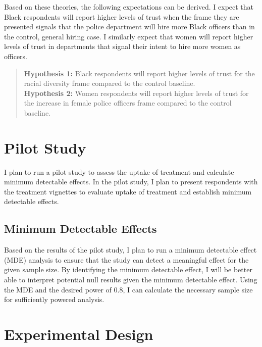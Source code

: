\documentclass[12pt]{article}
\begin{document}
Based on these theories, the following expectations can be derived. I expect that Black respondents will report higher levels of trust when the frame they are presented signals that the police department will hire more Black officers than in the control, general hiring case. I similarly expect that women will report higher levels of trust in departments that signal their intent to hire more women as officers. 

\begin{quote}
    \textbf{Hypothesis 1:} Black respondents will report higher levels of trust for the racial diversity frame compared to the control baseline.\\
    \textbf{Hypothesis 2:} Women respondents will report higher levels of trust for the increase in female police officers frame compared to the control baseline.
\end{quote}



\section{Pilot Study}

I plan to run a pilot study to assess the uptake of treatment and calculate minimum detectable effects. In the pilot study, I plan to present respondents with the treatment vignettes to evaluate uptake of treatment and establish minimum detectable effects.

\subsection{Minimum Detectable Effects}

Based on the results of the pilot study, I plan to run a minimum detectable effect (MDE) analysis to ensure that the study can detect a meaningful effect for the given sample size. By identifying the minimum detectable effect, I will be better able to interpret potential null results given the minimum detectable effect. Using the MDE and the desired power of 0.8, I can calculate the necessary sample size for sufficiently powered analysis.


\section{Experimental Design}
\end{document}
